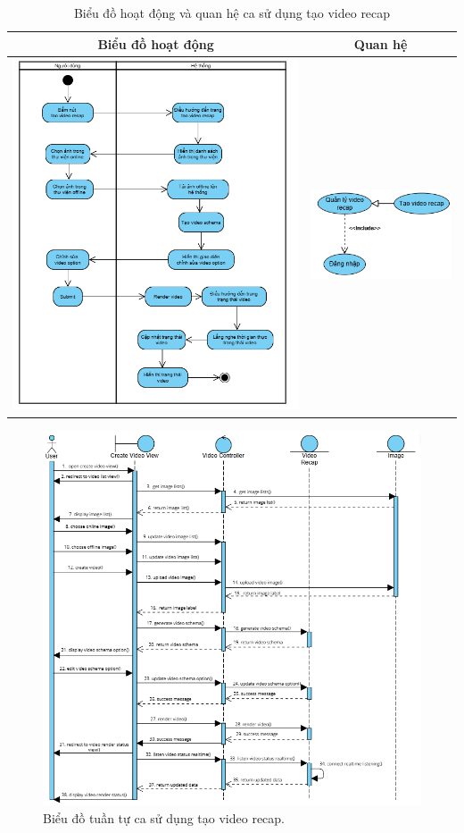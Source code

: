\vspace{0.8cm}

\noindent 
\begin{table}[H]
\centering
\caption{Biểu đồ hoạt động và quan hệ ca sử dụng tạo video recap}
\label{tab:create-video-recap-usecase-activity}
\begin{tabular}{| c | c |}
    \hline
    \textbf{Biểu đồ hoạt động} & \textbf{Quan hệ} \\ 
    \hline
    \includegraphics[width=0.6\linewidth]{figures/c3/3-3-9-activity-diagram.png} 
    &  
    \includegraphics[width=0.35\linewidth]{figures/c3/3-3-9-relationship.png} \\ 
    \hline
\end{tabular}
\end{table}

\begin{figure}[H]
    \centering  
    \includegraphics[width=1\textwidth]{figures/c3/3-3-9-sequence-diagram.png}
    \caption{Biểu đồ tuần tự ca sử dụng tạo video recap.}
    \label{fig:3-3-9-sequence-diagram}
\end{figure}
